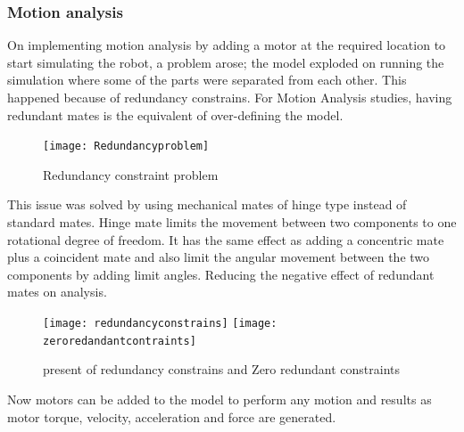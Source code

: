 \newpage
\subsubsection{Motion analysis}
 On implementing motion analysis by adding a motor at the required location to start simulating the robot, a problem arose; the model exploded on running the simulation where some of the parts were separated from each other. This happened because of redundancy constrains. For Motion Analysis studies, having redundant mates is the equivalent of over-defining the model.  

\begin{figure}[H]
	\centering
	\texttt{[image: Redundancyproblem]}
    	\caption{Redundancy constraint problem}
\end{figure}

 This issue was solved by using mechanical mates of hinge type instead of standard mates. Hinge mate limits the movement between two components to one rotational degree of freedom. It has the same effect as adding a concentric mate plus a coincident mate and also limit the angular movement between the two components by adding limit angles. Reducing the negative effect of redundant mates on analysis.
\begin{figure}
	\centering
	\texttt{[image: redundancyconstrains]}
    	\texttt{[image: zeroredandantcontraints]}
    	\caption{present of redundancy constrains and Zero redundant constraints}
\end{figure}

 Now motors can be added to the model to perform any motion and results as motor torque, velocity, acceleration and force are generated.
 
